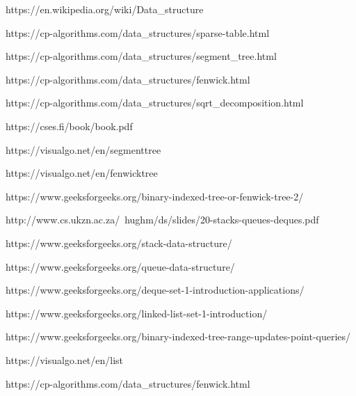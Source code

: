 \documentclass[12pt]{article}
\begin{document}
    \begin{thebibliography}{2}
    
    
    https://en.wikipedia.org/wiki/Data\_structure    

    https://cp-algorithms.com/data\_structures/sparse-table.html

    https://cp-algorithms.com/data\_structures/segment\_tree.html
    
    https://cp-algorithms.com/data\_structures/fenwick.html
  
    https://cp-algorithms.com/data\_structures/sqrt\_decomposition.html
    
    https://cses.fi/book/book.pdf
    
    https://visualgo.net/en/segmenttree
    
    https://visualgo.net/en/fenwicktree
    

    https://www.geeksforgeeks.org/binary-indexed-tree-or-fenwick-tree-2/
    
    
    http://www.cs.ukzn.ac.za/~hughm/ds/slides/20-stacks-queues-deques.pdf
    
    
    https://www.geeksforgeeks.org/stack-data-structure/    
    
    
    https://www.geeksforgeeks.org/queue-data-structure/
    
    
    https://www.geeksforgeeks.org/deque-set-1-introduction-applications/    
    
    
    https://www.geeksforgeeks.org/linked-list-set-1-introduction/
    
    
    https://www.geeksforgeeks.org/binary-indexed-tree-range-updates-point-queries/
    
    
    https://visualgo.net/en/list    


    https://cp-algorithms.com/data\_structures/fenwick.html
    
    \end{thebibliography} 

 
\end{document}
